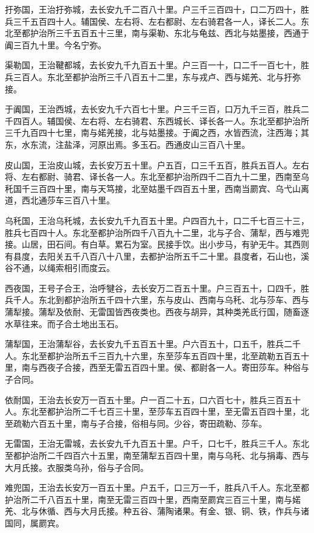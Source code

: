 \documentclass[]{article}
\begin{document}
扜弥国，王治扜弥城，去长安九千二百八十里。户三千三百四十，口二万四十，胜兵三千五百四十人。辅国侯、左右将、左右都尉、左右骑君各一人，译长二人。东北至都护治所三千五百五十三里，南与渠勒、东北与龟兹、西北与姑墨接，西通于阗三百九十里。今名宁弥。

渠勒国，王治鞬都城，去长安九千九百五十里。户三百一十，口二千一百七十，胜兵三百人。东北至都护治所三千八百五十二里，东与戎卢、西与婼羌、北与扜弥接。

于阗国，王治西城，去长安九千六百七十里。户三千三百，口万九千三百，胜兵二千四百人。辅国侯、左右将、左右骑君、东西城长、译长各一人。东北至都护治所三千九百四十七里，南与婼羌接，北与姑墨接。于阗之西，水皆西流，注西海；其东，水东流，注盐泽，河原出焉。多玉石。西通皮山三百八十里。

皮山国，王治皮山城，去长安万五十里。户五百，口三千五百，胜兵五百人。左右将、左右都尉、骑君、译长各一人。东北至都护治所四千二百九十二里，西南至乌秅国千三百四十里，南与天笃接，北至姑墨千四百五十里，西南当罽宾、乌弋山离道，西北通莎车三百八十里。

乌秅国，王治乌秅城，去长安九千九百五十里。户四百九十，口二千七百三十三，胜兵七百四十人。东北至都护治所四千八百九十二里，北与子合、蒲犁，西与难兜接。山居，田石间。有白草。累石为室。民接手饮。出小步马，有驴无牛。其西则有县度，去阳关五千八百八十八里，去都护治所五千二十里。县度者，石山也，溪谷不通，以绳索相引而度云。

西夜国，王号子合王，治呼犍谷，去长安万二百五十里。户三百五十，口四千，胜兵千人。东北到都护治所五千四十六里，东与皮山、西南与乌秅、北与莎车、西与蒲犁接。蒲犁及依耐、无雷国皆西夜类也。西夜与胡异，其种类羌氐行国，随畜逐水草往来。而子合土地出玉石。

蒲犁国，王治蒲犁谷，去长安九千五百五十里。户六百五十，口五千，胜兵二千人。东北至都护治所五千三百九十六里，东至莎车五百四十里，北至疏勒五百五十里，南与西夜子合接，西至无雷五百四十里。侯、都尉各一人。寄田莎车。种俗与子合同。

依耐国，王治去长安万一百五十里。户一百二十五，口六百七十，胜兵三百五十人。东北至都护治所二千七百三十里，至莎车五百四十里，至无雷五百四十里，北至疏勒六百五十里，南与子合接，俗相与同。少谷，寄田疏勒、莎车。

无雷国，王治无雷城，去长安九千九百五十里。户千，口七千，胜兵三千人。东北至都护治所二千四百六十五里，南至蒲犁五百四十里，南与乌秅、北与捐毒、西与大月氏接。衣服类乌孙，俗与子合同。

难兜国，王治去长安万一百五十里。户五千，口三万一千，胜兵八千人。东北至都护治所二千八百五十里，南至无雷三百四十里，西南至罽宾三百三十里，南与婼羌、北与休循、西与大月氏接。种五谷、蒲陶诸果。有金、银、铜、铁，作兵与诸国同，属罽宾。
\end{document}
